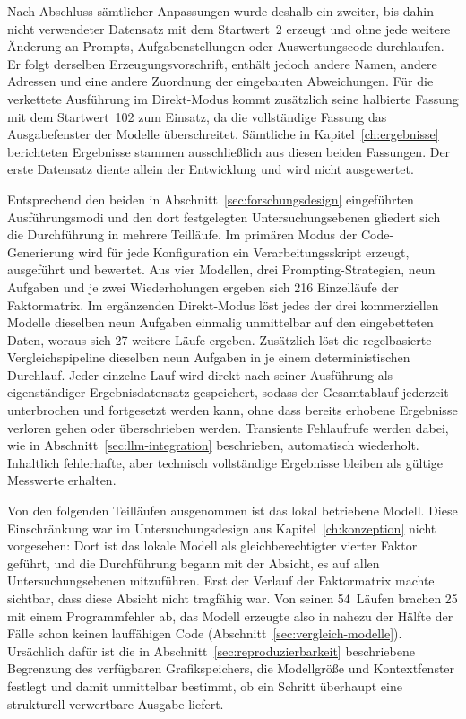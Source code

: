 Nach Abschluss sämtlicher Anpassungen wurde deshalb ein zweiter, bis dahin nicht verwendeter Datensatz mit dem Startwert~2 erzeugt und ohne jede weitere Änderung an Prompts, Aufgabenstellungen oder Auswertungscode durchlaufen. Er folgt derselben Erzeugungsvorschrift, enthält jedoch andere Namen, andere Adressen und eine andere Zuordnung der eingebauten Abweichungen. Für die verkettete Ausführung im Direkt-Modus kommt zusätzlich seine halbierte Fassung mit dem Startwert~102 zum Einsatz, da die vollständige Fassung das Ausgabefenster der Modelle überschreitet. Sämtliche in Kapitel~\ref{ch:ergebnisse} berichteten Ergebnisse stammen ausschließlich aus diesen beiden Fassungen. Der erste Datensatz diente allein der Entwicklung und wird nicht ausgewertet.

Entsprechend den beiden in Abschnitt~\ref{sec:forschungsdesign} eingeführten Ausführungsmodi und den dort festgelegten Untersuchungsebenen gliedert sich die Durchführung in mehrere Teilläufe. Im primären Modus der Code-Generierung wird für jede Konfiguration ein Verarbeitungsskript erzeugt, ausgeführt und bewertet. Aus vier Modellen, drei Prompting-Strategien, neun Aufgaben und je zwei Wiederholungen ergeben sich 216 Einzelläufe der Faktormatrix. Im ergänzenden Direkt-Modus löst jedes der drei kommerziellen Modelle dieselben neun Aufgaben einmalig unmittelbar auf den eingebetteten Daten, woraus sich 27 weitere Läufe ergeben. Zusätzlich löst die regelbasierte Vergleichspipeline dieselben neun Aufgaben in je einem deterministischen Durchlauf. Jeder einzelne Lauf wird direkt nach seiner Ausführung als eigenständiger Ergebnisdatensatz gespeichert, sodass der Gesamtablauf jederzeit unterbrochen und fortgesetzt werden kann, ohne dass bereits erhobene Ergebnisse verloren gehen oder überschrieben werden. Transiente Fehlaufrufe werden dabei, wie in Abschnitt~\ref{sec:llm-integration} beschrieben, automatisch wiederholt. Inhaltlich fehlerhafte, aber technisch vollständige Ergebnisse bleiben als gültige Messwerte erhalten.

Von den folgenden Teilläufen ausgenommen ist das lokal betriebene Modell. Diese Einschränkung war im Untersuchungsdesign aus Kapitel~\ref{ch:konzeption} nicht vorgesehen: Dort ist das lokale Modell als gleichberechtigter vierter Faktor geführt, und die Durchführung begann mit der Absicht, es auf allen Untersuchungsebenen mitzuführen. Erst der Verlauf der Faktormatrix machte sichtbar, dass diese Absicht nicht tragfähig war. Von seinen 54~Läufen brachen 25 mit einem Programmfehler ab, das Modell erzeugte also in nahezu der Hälfte der Fälle schon keinen lauffähigen Code (Abschnitt~\ref{sec:vergleich-modelle}). Ursächlich dafür ist die in Abschnitt~\ref{sec:reproduzierbarkeit} beschriebene Begrenzung des verfügbaren Grafikspeichers, die Modellgröße und Kontextfenster festlegt und damit unmittelbar bestimmt, ob ein Schritt überhaupt eine strukturell verwertbare Ausgabe liefert.


